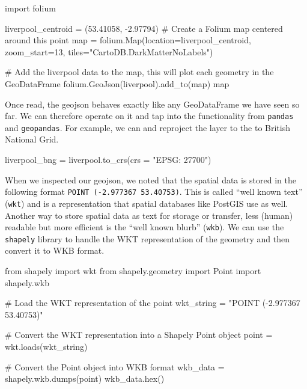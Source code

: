 \documentclass[
  letterpaper,
  DIV=11,
  numbers=noendperiod]{scrreprt}
\newenvironment{Shaded}{\begin{snugshade}}{\end{snugshade}}
\newcommand{\BuiltInTok}[1]{\textcolor[rgb]{0.00,0.23,0.31}{#1}}
\newcommand{\CommentTok}[1]{\textcolor[rgb]{0.37,0.37,0.37}{#1}}
\newcommand{\DecValTok}[1]{\textcolor[rgb]{0.68,0.00,0.00}{#1}}
\newcommand{\FloatTok}[1]{\textcolor[rgb]{0.68,0.00,0.00}{#1}}
\newcommand{\ImportTok}[1]{\textcolor[rgb]{0.00,0.46,0.62}{#1}}
\newcommand{\NormalTok}[1]{\textcolor[rgb]{0.00,0.23,0.31}{#1}}
\newcommand{\OperatorTok}[1]{\textcolor[rgb]{0.37,0.37,0.37}{#1}}
\newcommand{\StringTok}[1]{\textcolor[rgb]{0.13,0.47,0.30}{#1}}
\begin{document}
\begin{Shaded}
\begin{Highlighting}[]
\ImportTok{import}\NormalTok{ folium }

\NormalTok{liverpool\_centroid }\OperatorTok{=}\NormalTok{ (}\FloatTok{53.41058}\NormalTok{, }\OperatorTok{{-}}\FloatTok{2.97794}\NormalTok{)}
\CommentTok{\# Create a Folium map centered around this point}
\BuiltInTok{map} \OperatorTok{=}\NormalTok{ folium.Map(location}\OperatorTok{=}\NormalTok{liverpool\_centroid, zoom\_start}\OperatorTok{=}\DecValTok{13}\NormalTok{, tiles}\OperatorTok{=}\StringTok{"CartoDB.DarkMatterNoLabels"}\NormalTok{)}

\CommentTok{\# Add the liverpool data to the map, this will plot each geometry in the GeoDataFrame}
\NormalTok{folium.GeoJson(liverpool).add\_to(}\BuiltInTok{map}\NormalTok{)}
\BuiltInTok{map}
\end{Highlighting}
\end{Shaded}

Once read, the geojson behaves exactly like any GeoDataFrame we have
seen so far. We can therefore operate on it and tap into the
functionality from \texttt{pandas} and \texttt{geopandas}. For example,
we can and reproject the layer to the to British National Grid.

\begin{Shaded}
\begin{Highlighting}[]
\NormalTok{liverpool\_bng }\OperatorTok{=}\NormalTok{ liverpool.to\_crs(crs }\OperatorTok{=} \StringTok{"EPSG: 27700"}\NormalTok{)}
\end{Highlighting}
\end{Shaded}

When we inspected our geojson, we noted that the spatial data is stored
in the following format \texttt{POINT\ (-2.977367\ 53.40753)}. This is
called ``well known text'' (\texttt{wkt}) and is a representation that
spatial databases like PostGIS use as well. Another way to store spatial
data as text for storage or transfer, less (human) readable but more
efficient is the ``well known blurb'' (\texttt{wkb}). We can use the
\texttt{shapely} library to handle the WKT representation of the
geometry and then convert it to WKB format.

\begin{Shaded}
\begin{Highlighting}[]
\ImportTok{from}\NormalTok{ shapely }\ImportTok{import}\NormalTok{ wkt}
\ImportTok{from}\NormalTok{ shapely.geometry }\ImportTok{import}\NormalTok{ Point}
\ImportTok{import}\NormalTok{ shapely.wkb}

\CommentTok{\# Load the WKT representation of the point}
\NormalTok{wkt\_string }\OperatorTok{=} \StringTok{"POINT ({-}2.977367 53.40753)"}

\CommentTok{\# Convert the WKT representation into a Shapely Point object}
\NormalTok{point }\OperatorTok{=}\NormalTok{ wkt.loads(wkt\_string)}

\CommentTok{\# Convert the Point object into WKB format}
\NormalTok{wkb\_data }\OperatorTok{=}\NormalTok{ shapely.wkb.dumps(point)}
\NormalTok{wkb\_data.}\BuiltInTok{hex}\NormalTok{()}
\end{Highlighting}
\end{Shaded}
\end{document}
